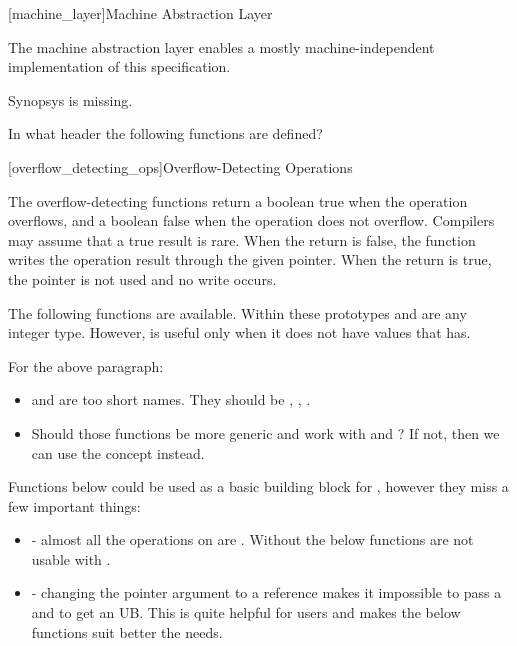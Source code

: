 \begin{addedblock}
[machine_layer]{Machine Abstraction Layer}

The machine abstraction layer enables a mostly machine-independent implementation of this specification.

\begin{modifcommentblock}
Synopsys is missing.

In what header the following functions are defined?
\end{modifcommentblock}

[overflow_detecting_ops]{Overflow-Detecting Operations}

The overflow-detecting functions return a boolean true when the operation overflows, and a boolean false when the operation does not overflow. Compilers may assume that a true result is rare. When the return is false, the function writes the operation result through the given pointer. When the return is true, the pointer is not used and no write occurs.

The following functions are available. Within these prototypes  and  are any integer type. However,  is useful only when it does not have values that  has.

\begin{modifcommentblock}
For the above paragraph:
\begin{itemize}
  \item {} and  are too short names. They should be , , .
  \item Should those functions be more generic and work with  and ? If not, then we can use the concept  instead.
\end{itemize}
\end{modifcommentblock}

\begin{modifcommentblock}
Functions below could be used as a basic building block for , however they miss a few important things:
\begin{itemize}
  \item {} - almost all the operations on  are . Without  the below functions are not usable with .
  \item {} - changing the pointer argument to a reference makes it impossible to pass a  and to get an UB. This is quite helpful for users and makes the below functions suit better the  needs.
\end{itemize}
\end{modifcommentblock}


\end{addedblock}
